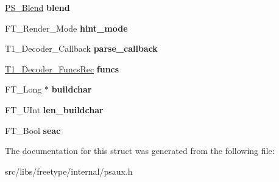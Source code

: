 \begin{DoxyCompactItemize}
\item 
\hypertarget{struct_t1___decoder_rec___a0cd698c7041cb4f319949b62f215f7c7}{
\hyperlink{struct_p_s___blend_rec__}{PS\_\-Blend} {\bfseries blend}}
\label{struct_t1___decoder_rec___a0cd698c7041cb4f319949b62f215f7c7}

\item 
\hypertarget{struct_t1___decoder_rec___a364b15149edb573dcc79be015eba61b4}{
FT\_\-Render\_\-Mode {\bfseries hint\_\-mode}}
\label{struct_t1___decoder_rec___a364b15149edb573dcc79be015eba61b4}

\item 
\hypertarget{struct_t1___decoder_rec___a840af0b01e7adb1e3aa521a936196b62}{
T1\_\-Decoder\_\-Callback {\bfseries parse\_\-callback}}
\label{struct_t1___decoder_rec___a840af0b01e7adb1e3aa521a936196b62}

\item 
\hypertarget{struct_t1___decoder_rec___a6b0f5f7cb3f44e88880aa9c927d79775}{
\hyperlink{struct_t1___decoder___funcs_rec__}{T1\_\-Decoder\_\-FuncsRec} {\bfseries funcs}}
\label{struct_t1___decoder_rec___a6b0f5f7cb3f44e88880aa9c927d79775}

\item 
\hypertarget{struct_t1___decoder_rec___a967ee06cbbdc8823be8f95df5db625b9}{
FT\_\-Long $\ast$ {\bfseries buildchar}}
\label{struct_t1___decoder_rec___a967ee06cbbdc8823be8f95df5db625b9}

\item 
\hypertarget{struct_t1___decoder_rec___a55fd1c88d6f7badaec2aa13db17c816f}{
FT\_\-UInt {\bfseries len\_\-buildchar}}
\label{struct_t1___decoder_rec___a55fd1c88d6f7badaec2aa13db17c816f}

\item 
\hypertarget{struct_t1___decoder_rec___a45bf18b54ff973177ea3061ef0b705c6}{
FT\_\-Bool {\bfseries seac}}
\label{struct_t1___decoder_rec___a45bf18b54ff973177ea3061ef0b705c6}

\end{DoxyCompactItemize}


The documentation for this struct was generated from the following file:\begin{DoxyCompactItemize}
\item 
src/libs/freetype/internal/psaux.h\end{DoxyCompactItemize}
